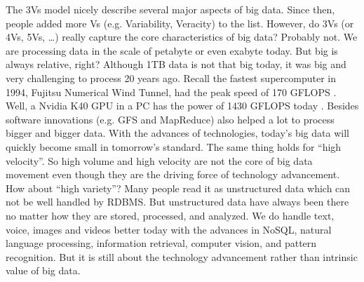 \documentclass[12pt]{book}
\begin{document}
The 3Vs model nicely describe several major aspects of big data. Since then, people added more Vs (e.g. Variability, Veracity) to the list. However, do 3Vs (or 4Vs, 5Vs, \ldots) really capture the core characteristics of big data? Probably not. We are processing data in the scale of petabyte or even exabyte today. But big is always relative, right? Although 1TB data is not that big today, it was big and very challenging to process 20 years ago. Recall the fastest supercomputer in 1994, Fujitsu Numerical Wind Tunnel, had the peak speed of 170 GFLOPS \cite{Top500}. Well, a Nvidia K40 GPU in a PC has the power of 1430 GFLOPS today \cite{Nvidia2014}. Besides software innovations (e.g. GFS and MapReduce) also helped a lot to process bigger and bigger data. With the advances of technologies, today's big data will quickly become small in tomorrow's standard. The same thing holds for ``high velocity''. So high volume and high velocity are not the core of big data movement even though they are the driving force of technology advancement. How about ``high variety''? Many people read it as unstructured data which can not be well handled by RDBMS. But unstructured data have always been there no matter how they are stored, processed, and analyzed. We do handle text, voice, images and videos better today with the advances in NoSQL, natural language processing, information retrieval, computer vision, and pattern recognition. But it is still about the technology advancement rather than intrinsic value of big data.
\end{document}
